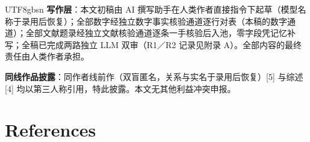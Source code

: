\documentclass[10pt,a4paper]{article}
\begin{document}
\begin{CJK}{UTF8}{gbsn}
\textbf{写作层}：本文初稿由 AI 撰写助手在人类作者直接指令下起草（模型名称于录用后恢复）；全部数字经独立数字事实核验通道逐行对表（本稿的数字通道）；全部文献题录经独立文献核验通道逐条一手核验后入池，零字段凭记忆补写；全稿已完成两路独立 LLM 双审（R1／R2 记录见附录 A）。全部内容的最终责任由人类作者承担。

\textbf{同线作品披露}：同作者线前作（双盲匿名，关系与实名于录用后恢复）[5] 与综述 [4] 均以第三人称引用，特此披露。本文无其他利益冲突申报。


\section*{References}\begin{list}{}{%
  \setlength{\leftmargin}{2.3em}\setlength{\itemindent}{-2.3em}%
  \setlength{\labelwidth}{2.1em}\setlength{\labelsep}{0.2em}%
  \setlength{\itemsep}{2pt}\setlength{\parsep}{0pt}\setlength{\topsep}{4pt}}


\end{list}
\end{CJK}
\end{document}

